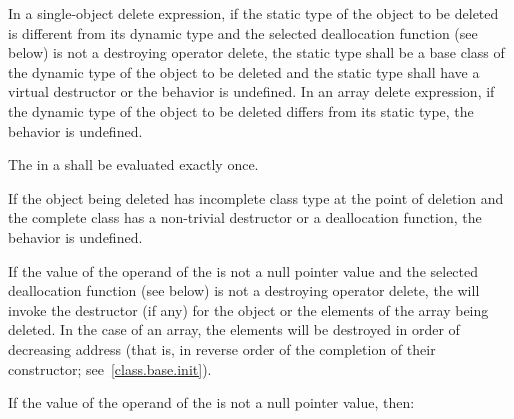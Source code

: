 \pnum
{}%
In a single-object delete expression, if the static type of the object to be
deleted is different from its dynamic type
and the selected deallocation function (see below)
is not a destroying operator delete,
the static type shall be a base
class of the dynamic type of the object to be deleted and the static type shall
have a virtual destructor or the behavior is undefined. In an array delete
expression, if the dynamic type of the object to be deleted differs from its
static type, the behavior is undefined.

\pnum
The  in a  shall
be evaluated exactly once.

\pnum
{}%
If the object being deleted has incomplete class type at the point of
deletion and the complete class has a non-trivial destructor or a
deallocation function, the behavior is undefined.

\pnum
{}%
If the value of the operand of the  is not a
null pointer value
and the selected deallocation function (see below)
is not a destroying operator delete,
the  will invoke the
destructor (if any) for the object or the elements of the array being
deleted. In the case of an array, the elements will be destroyed in
order of decreasing address (that is, in reverse order of the completion
of their constructor; see~\ref{class.base.init}).

\pnum
If the value of the operand of the  is not a
null pointer value, then:

